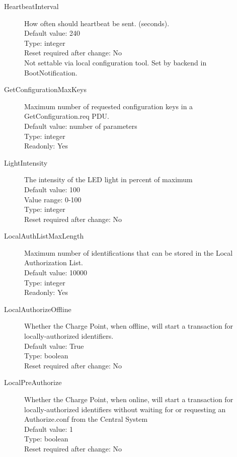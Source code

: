 \begin{description}
\item[HeartbeatInterval] How often should heartbeat be sent. (seconds).\\
  Default value: 240\\
  Type: integer\\
  Reset required after change: No\\
  Not settable via local configuration tool. Set by backend in BootNotification.\\

\item[GetConfigurationMaxKeys]  Maximum number of requested configuration keys in a GetConfiguration.req PDU.\\
  Default value: number of parameters\\
  Type: integer\\
  Readonly: Yes\\

\item[LightIntensity] The intensity of the LED light in percent of maximum\\
  Default value: 100\\
  Value range: 0-100\\
  Type: integer\\
  Reset required after change: No\\

\item[LocalAuthListMaxLength] Maximum number of identifications that can be stored in the Local Authorization List.\\
  Default value: 10000\\
  Type: integer\\
  Readonly: Yes\\

\item[LocalAuthorizeOffline] Whether the Charge Point, when offline, will start a transaction for locally-authorized identifiers.\\
  Default value: True\\
  Type: boolean\\
  Reset required after change: No\\

\item[LocalPreAuthorize] Whether the Charge Point, when online, will start a transaction for locally-authorized identifiers without waiting for or requesting an Authorize.conf from the Central System\\
  Default value: 1\\
  Type: boolean\\
  Reset required after change: No\\


\end{description}
